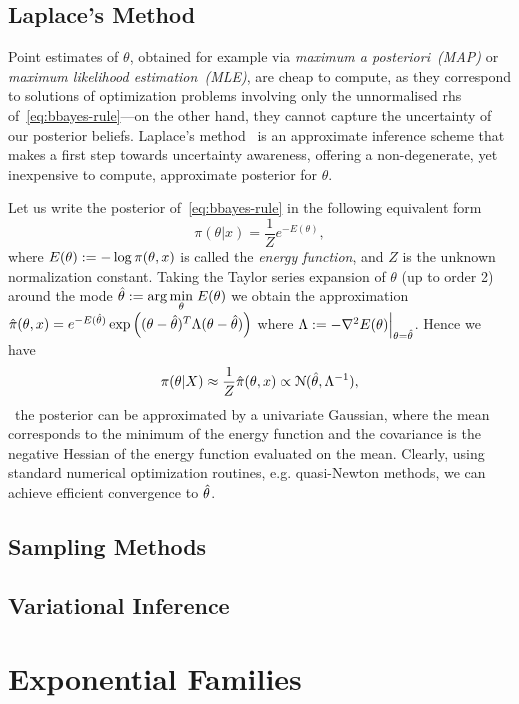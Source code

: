 \subsection{Laplace's Method}
\label{subsec:b-laplace-method}

Point estimates of $\theta$, obtained for example via \emph{maximum a posteriori~(MAP)} or \emph{maximum likelihood estimation~(MLE)}, are cheap to compute, as they correspond to solutions of optimization problems involving only the unnormalised rhs of~\cref{eq:bbayes-rule}---on the other hand, they cannot capture the uncertainty of our posterior beliefs. Laplace's method~\citep{mackay03} is an approximate inference scheme that makes a first step towards uncertainty awareness, offering a non-degenerate, yet inexpensive to compute, approximate posterior for $\theta$.

Let us write the posterior of~\cref{eq:bbayes-rule} in the following equivalent form
\[
\pi(\theta|x) = \frac{1}{Z} e^{-E(\theta)},
\]
where $E(\theta) := - \log \pi(\theta, x)$ is called the \emph{energy function}, and $ Z $ is the unknown normalization constant. Taking the Taylor series expansion of $\theta$ (up to order 2) around the mode $ {\hat{\theta} := \arg \underset{\theta}{\min} \;E(\theta)}$ we obtain the approximation 
$ \hat{\pi}(\theta, x) = e^{-E(\hat{\theta})}\exp\left((\theta - \hat{\theta})^T\Lambda (\theta - \hat{\theta})\right)$ where  $ \Lambda := -\nabla^2 E(\theta)\Big|_{\theta = \hat{\theta}}$.
Hence we have
\[
\pi(\theta|X) \approx \frac{1}{Z}   \hat{\pi}(\theta, x)  \propto \mathcal{N}(\hat{\theta}, \Lambda^{-1}), 
\label{eq:blaplace-approx}
\]  
\ie~the posterior can be approximated by a univariate Gaussian, where the mean corresponds to the minimum of the energy function and the covariance is the negative Hessian of the energy function evaluated on the mean. Clearly, using standard numerical optimization routines, e.g. quasi-Newton methods, we can achieve efficient convergence to $\hat{\theta}$. 

\subsection{Sampling Methods}
\label{subsec:b-sampling-methods}

\subsection{Variational Inference}
\label{subsec:b-variational-inference}

\section{Exponential Families}
\label{sec:b-expfam}


